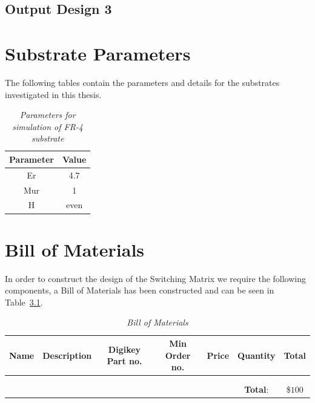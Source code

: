 \documentclass[12pt,openany,a4paper]{book}
\newcommand{\tab}[1]  {Table~\ref{#1}}		%
\begin{document}
\section{Output Design 3}	\label{sec:pcb_outdesign3}
















\chapter{Substrate Parameters}
The following tables contain the parameters and details for the substrates investigated in this thesis. \newline
\begin{table}[!htbp]
\centering
\begin{tabular}{|c|c|}
\hline
Parameter 	& Value \\
\hline
Er 	& 4.7 	\\
Mur 	& 1 \\
H 	& even 	\\
\hline
\end{tabular}
\label{tab:substrate}
\caption{\sl Parameters for simulation of FR-4 substrate}
\end{table}

\chapter{Bill of Materials}
In order to construct the design of the Switching Matrix we require the following components, a Bill of Materials has been constructed and can be seen in \tab{tab:bom}.
\begin{table}[!htbp]
\centering
\begin{tabular}{|c|c|c|c|c|c|c|}
\hline
Name & Description & Digikey Part no. & Min Order no. & Price & Quantity & Total \\
\hline
& & & & & & \\
\hline
\multicolumn{7}{c}{} \\
\hline
\multicolumn{5}{|c}{} & \textbf{Total}: & \$$100$\\
\hline
\end{tabular}
\label{tab:bom}
\caption{\sl Bill of Materials}
\end{table}
\end{document}
